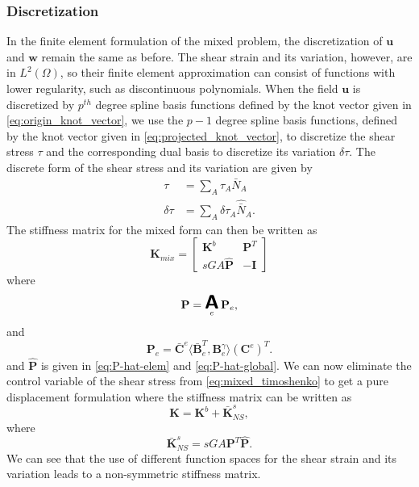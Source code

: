 \subsubsection{Discretization}
{In the finite element formulation of the mixed problem, the discretization of $\mathbf{u}$ and $\mathbf{w}$ remain the same as before. The shear strain and its variation, however, are in $L^2(\Omega)$, so their finite element approximation can consist of functions with lower regularity, such as discontinuous polynomials. When the field $\mathbf{u}$ is discretized by $p^{th}$ degree spline basis functions defined by the knot vector given in \eqref{eq:origin_knot_vector}, we use the $p-1$ degree spline basis functions, defined by the knot vector given in \eqref{eq:projected_knot_vector}, to discretize the shear stress $\tau$ and the corresponding dual basis to discretize its variation $\delta\tau$. The discrete form of the shear stress and its variation are given by}
\begin{align}
    \tau       & =\sum_A\tau_A\bar{N}_A              \\
    \delta\tau & =\sum_A\delta\tau_A\hat{\bar{N}}_A.
\end{align}
{The stiffness matrix for the mixed form can then be written as}
\begin{equation}
    \mathbf{K}_{mix} =
    \begin{bmatrix}
        \mathbf{K}^b        & \mathbf{P}^T \\
        sGA\hat{\mathbf{P}} & -\mathbf{I}
    \end{bmatrix}
    \label{eq:mixed_timoshenko}
\end{equation}
{where}
\begin{equation}
    \mathbf{P}=\A_e\mathbf{P}_e,
\end{equation}
{and}
\begin{equation}
    \mathbf{P}_e=\bar{\mathbf{C}}^e\langle{\bar{\mathbf{B}}_e^T,\mathbf{B}^\gamma_e}\rangle(\mathbf{C}^e)^T.
\end{equation}
{ and $\hat{\mathbf{P}}$ is given in \eqref{eq:P-hat-elem} and \eqref{eq:P-hat-global}.
We can now eliminate the control variable of the shear stress from \eqref{eq:mixed_timoshenko} to get a pure displacement formulation where the stiffness matrix can be written as}
\begin{equation}
    \mathbf{K}=\mathbf{K}^b+\bar{\mathbf{K}}^s_{NS},
\end{equation}
where
\begin{equation}
    \bar{\mathbf{K}}^s_{NS}=sGA\mathbf{P}^T\hat{\mathbf{P}}.
    \label{eq:nonsymmetric_timoshenko}
\end{equation}
{We can see that the use of different function spaces for the shear strain and its variation leads to a non-symmetric stiffness matrix.}

